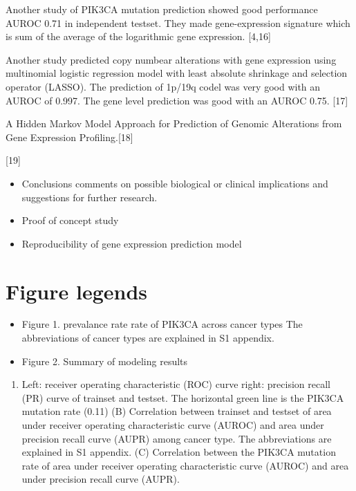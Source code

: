 \documentclass[10pt,letterpaper]{article}
\providecommand{\tightlist}{%
  \setlength{\itemsep}{0pt}\setlength{\parskip}{0pt}}
\begin{document}
Another study of PIK3CA mutation prediction showed good performance
AUROC 0.71 in independent testset. They made gene-expression signature
which is sum of the average of the logarithmic gene expression.
{[}4,16{]}

Another study predicted copy numbear alterations with gene expression
using multinomial logistic regression model with least absolute
shrinkage and selection operator (LASSO). The prediction of 1p/19q codel
was very good with an AUROC of 0.997. The gene level prediction was good
with an AUROC 0.75. {[}17{]}

A Hidden Markov Model Approach for Prediction of Genomic Alterations
from Gene Expression Profiling.{[}18{]}

{[}19{]}

\begin{itemize}
\item
  Conclusions comments on possible biological or clinical implications
  and suggestions for further research.
\item
  Proof of concept study\\
\item
  Reproducibility of gene expression prediction model
\end{itemize}

\hypertarget{figure-legends}{%
\section{Figure legends}\label{figure-legends}}

\begin{itemize}
\item
  Figure 1. prevalance rate rate of PIK3CA across cancer types The
  abbreviations of cancer types are explained in S1 appendix.
\item
  Figure 2. Summary of modeling results
\end{itemize}

\begin{enumerate}
\def\labelenumi{(\Alph{enumi})}
\tightlist
\item
  Left: receiver operating characteristic (ROC) curve right: precision
  recall (PR) curve of trainset and testset. The horizontal green line
  is the PIK3CA mutation rate (0.11) (B) Correlation between trainset
  and testset of area under receiver operating characteristic curve
  (AUROC) and area under precision recall curve (AUPR) among cancer
  type. The abbreviations are explained in S1 appendix. (C) Correlation
  between the PIK3CA mutation rate of area under receiver operating
  characteristic curve (AUROC) and area under precision recall curve
  (AUPR).
\end{enumerate}
\end{document}
